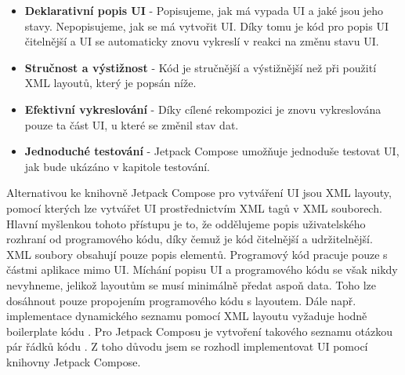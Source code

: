 \begin{itemize}
	\item \textbf{Deklarativní popis UI} - Popisujeme, jak má vypada UI a jaké jsou jeho stavy. Nepopisujeme, jak se má vytvořit UI. Díky tomu je kód pro popis UI čitelnější a UI se automaticky znovu vykreslí v reakci na změnu stavu UI.
	
	\item \textbf{Stručnost a výstižnost} - Kód je stručnější a výstižnější než při použití XML layoutů, který je popsán níže.
	
	\item \textbf{Efektivní vykreslování} - Díky cílené rekompozici je znovu vykreslována pouze ta část UI, u které se změnil stav dat.
	
	\item \textbf{Jednoduché testování} - Jetpack Compose umožňuje jednoduše testovat UI, jak bude ukázáno v kapitole testování.
\end{itemize}

\noindent Alternativou ke knihovně Jetpack Compose pro vytváření UI jsou XML layouty, pomocí kterých lze vytvářet UI prostřednictvím XML tagů v XML souborech. Hlavní myšlenkou tohoto přístupu je to, že oddělujeme popis uživatelského rozhraní od programového kódu, díky čemuž je kód čitelnější a udržitelnější. XML soubory obsahují pouze popis elementů. Programový kód pracuje pouze s částmi aplikace mimo UI. Míchání popisu UI a programového kódu se však nikdy nevyhneme, jelikož layoutům se musí minimálně předat aspoň data. Toho lze dosáhnout pouze propojením programového kódu s layoutem. Dále např. implementace dynamického seznamu pomocí XML layoutu vyžaduje hodně boilerplate kódu \cite{recycler-view}. Pro Jetpack Composu je vytvoření takového seznamu otázkou pár řádků kódu \cite{lazy-column}. Z toho důvodu jsem se rozhodl implementovat UI pomocí knihovny Jetpack Compose.

